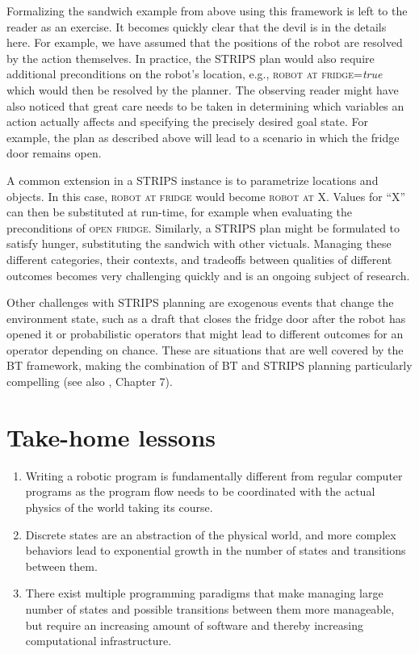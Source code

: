 Formalizing the sandwich example from above using this framework is left to the reader as an exercise. It becomes quickly clear that the devil is in the details here. For example, we have assumed that the positions of the robot are resolved by the action themselves. In practice, the STRIPS plan would also require additional preconditions on the robot's location, e.g., \textsc{robot at fridge}=\emph{true} which would then be resolved by the planner. The observing reader might have also noticed that great care needs to be taken in determining which variables an action actually affects and specifying the precisely desired goal state. For example, the plan as described above will lead to a scenario in which the fridge door remains open. 

A common extension in a STRIPS instance is to parametrize locations and objects. In this case, \textsc{robot at fridge} would become \textsc{robot at X}. Values for ``X'' can then be substituted at run-time, for example when evaluating the preconditions of \textsc{open fridge}. Similarly, a STRIPS plan might be formulated to satisfy hunger, substituting the sandwich with other victuals. Managing these different categories, their contexts, and tradeoffs between qualities of different outcomes becomes very challenging quickly and is an ongoing subject of research. 

Other challenges with STRIPS planning are exogenous events that change the environment state, such as a draft that closes the fridge door after the robot has opened it or probabilistic operators that might lead to different outcomes for an operator depending on chance. These are situations that are well covered by the BT framework, making the combination of BT and STRIPS planning particularly compelling (see also \cite{colledanchise2018behavior}, Chapter 7). 


\section*{Take-home lessons}
\begin{enumerate}
\item Writing a robotic program is fundamentally different from regular computer programs as the program flow needs to be coordinated with the actual physics of the world taking its course.
\item Discrete states are an abstraction of the physical world, and more complex behaviors lead to exponential growth in the number of states and transitions between them.
\item There exist multiple programming paradigms that make managing large number of states and possible transitions between them more manageable, but require an increasing amount of software and thereby increasing computational infrastructure.
\end{enumerate}

